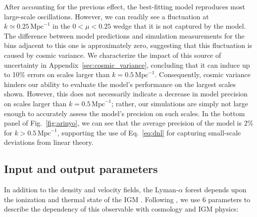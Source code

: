 \documentclass{aa}
\newcommand{\lyaf}{Lyman-$\alpha$ forest\xspace}
\newcommand{\iMpc}{\ensuremath{\,\mathrm{Mpc}^{-1}}}
\begin{document}
After accounting for the previous effect, the best-fitting model reproduces most large-scale oscillations. However, we can readily see a fluctuation at $k\simeq0.25\iMpc$ in the $0<\mu<0.25$ wedge that it is not captured by the model. The difference between model predictions and simulation measurements for the bins adjacent to this one is approximately zero, suggesting that this fluctuation is caused by cosmic variance. We characterize the impact of this source of uncertainty in Appendix~\ref{sec:cosmic_variance}, concluding that it can induce up to 10\% errors on scales larger than $k=0.5\iMpc$. Consequently, cosmic variance hinders our ability to evaluate the model's performance on the largest scales shown. However, this does not necessarily indicate a decrease in model precision on scales larger than $k=0.5\iMpc$; rather, our simulations are simply not large enough to accurately assess the model's precision on such scales. In the bottom panel of Fig.~\ref{fig:arinyo}, we can see that the average precision of the model is 2\% for $k>0.5\iMpc$, supporting the use of Eq.~\ref{eq:dnl} for capturing small-scale deviations from linear theory.


\subsection{Input and output parameters}
\label{sec:strategy_params}

In addition to the density and velocity fields, the \lyaf depends upon the ionization and thermal state of the IGM \citep[e.g.;][]{mcdonald2003MeasurementCosmologicalGeometry}. Following \citet{Pedersen2021}, we use 6 parameters to describe the dependency of this observable with cosmology and IGM physics:
\end{document}
